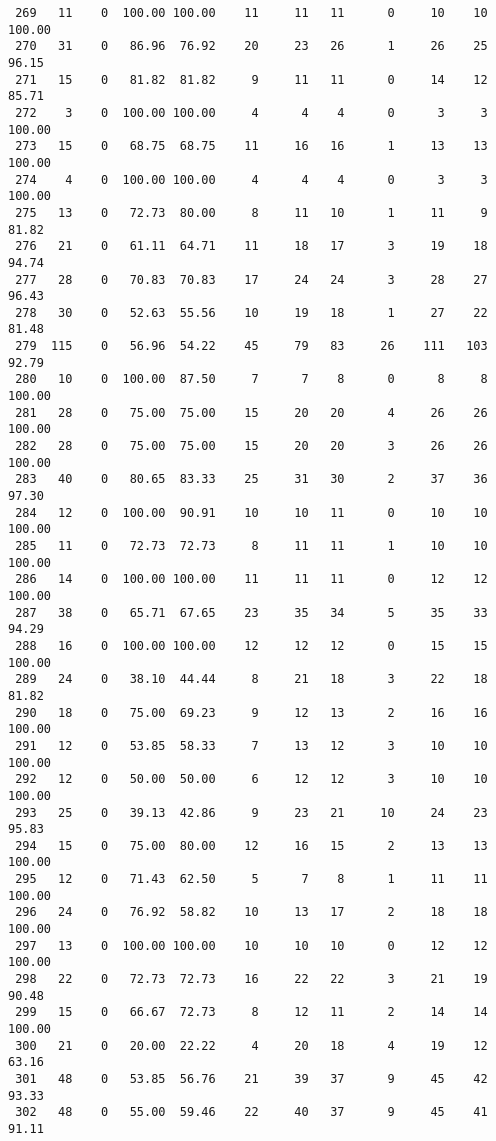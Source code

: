 \begin{verbatim}
 269   11    0  100.00 100.00    11     11   11      0     10    10   100.00
 270   31    0   86.96  76.92    20     23   26      1     26    25    96.15
 271   15    0   81.82  81.82     9     11   11      0     14    12    85.71
 272    3    0  100.00 100.00     4      4    4      0      3     3   100.00
 273   15    0   68.75  68.75    11     16   16      1     13    13   100.00
 274    4    0  100.00 100.00     4      4    4      0      3     3   100.00
 275   13    0   72.73  80.00     8     11   10      1     11     9    81.82
 276   21    0   61.11  64.71    11     18   17      3     19    18    94.74
 277   28    0   70.83  70.83    17     24   24      3     28    27    96.43
 278   30    0   52.63  55.56    10     19   18      1     27    22    81.48
 279  115    0   56.96  54.22    45     79   83     26    111   103    92.79
 280   10    0  100.00  87.50     7      7    8      0      8     8   100.00
 281   28    0   75.00  75.00    15     20   20      4     26    26   100.00
 282   28    0   75.00  75.00    15     20   20      3     26    26   100.00
 283   40    0   80.65  83.33    25     31   30      2     37    36    97.30
 284   12    0  100.00  90.91    10     10   11      0     10    10   100.00
 285   11    0   72.73  72.73     8     11   11      1     10    10   100.00
 286   14    0  100.00 100.00    11     11   11      0     12    12   100.00
 287   38    0   65.71  67.65    23     35   34      5     35    33    94.29
 288   16    0  100.00 100.00    12     12   12      0     15    15   100.00
 289   24    0   38.10  44.44     8     21   18      3     22    18    81.82
 290   18    0   75.00  69.23     9     12   13      2     16    16   100.00
 291   12    0   53.85  58.33     7     13   12      3     10    10   100.00
 292   12    0   50.00  50.00     6     12   12      3     10    10   100.00
 293   25    0   39.13  42.86     9     23   21     10     24    23    95.83
 294   15    0   75.00  80.00    12     16   15      2     13    13   100.00
 295   12    0   71.43  62.50     5      7    8      1     11    11   100.00
 296   24    0   76.92  58.82    10     13   17      2     18    18   100.00
 297   13    0  100.00 100.00    10     10   10      0     12    12   100.00
 298   22    0   72.73  72.73    16     22   22      3     21    19    90.48
 299   15    0   66.67  72.73     8     12   11      2     14    14   100.00
 300   21    0   20.00  22.22     4     20   18      4     19    12    63.16
 301   48    0   53.85  56.76    21     39   37      9     45    42    93.33
 302   48    0   55.00  59.46    22     40   37      9     45    41    91.11

\end{verbatim}

